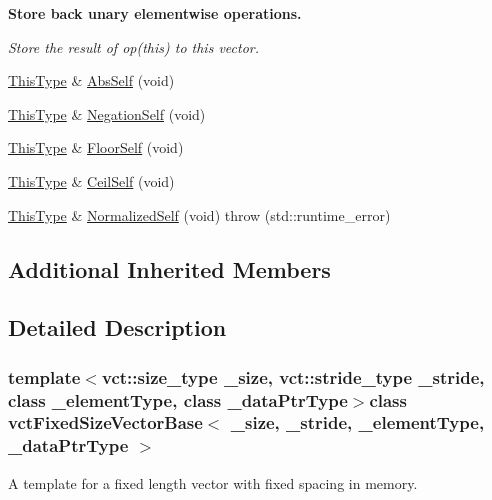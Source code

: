 \begin{Indent}{\bf Store back unary elementwise operations.}\par
{\em Store the result of op(this) to this vector. }\begin{DoxyCompactItemize}
\item 
\hyperlink{classvct_fixed_size_const_vector_base_a071063bc4fa43112cc287b2dbef53180}{This\-Type} \& \hyperlink{classvct_fixed_size_vector_base_acbdf50a6d67bfe155fa82f9b6061c6a5}{Abs\-Self} (void)
\item 
\hyperlink{classvct_fixed_size_const_vector_base_a071063bc4fa43112cc287b2dbef53180}{This\-Type} \& \hyperlink{classvct_fixed_size_vector_base_a5577761b2afff05b1e5bcb49c272d8d6}{Negation\-Self} (void)
\item 
\hyperlink{classvct_fixed_size_const_vector_base_a071063bc4fa43112cc287b2dbef53180}{This\-Type} \& \hyperlink{classvct_fixed_size_vector_base_adc23d443a899f5eaa0351e239fe6e7e0}{Floor\-Self} (void)
\item 
\hyperlink{classvct_fixed_size_const_vector_base_a071063bc4fa43112cc287b2dbef53180}{This\-Type} \& \hyperlink{classvct_fixed_size_vector_base_ac454fa176e22b7f6cc9d50e193004484}{Ceil\-Self} (void)
\item 
\hyperlink{classvct_fixed_size_const_vector_base_a071063bc4fa43112cc287b2dbef53180}{This\-Type} \& \hyperlink{classvct_fixed_size_vector_base_a3e90a135520a329e4168edec3d7dc3d8}{Normalized\-Self} (void)  throw (std\-::runtime\-\_\-error)
\end{DoxyCompactItemize}
\end{Indent}
\subsection*{Additional Inherited Members}


\subsection{Detailed Description}
\subsubsection*{template$<$vct\-::size\-\_\-type \-\_\-size, vct\-::stride\-\_\-type \-\_\-stride, class \-\_\-element\-Type, class \-\_\-data\-Ptr\-Type$>$class vct\-Fixed\-Size\-Vector\-Base$<$ \-\_\-size, \-\_\-stride, \-\_\-element\-Type, \-\_\-data\-Ptr\-Type $>$}

A template for a fixed length vector with fixed spacing in memory. 

